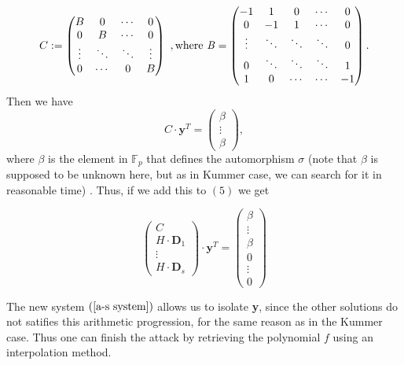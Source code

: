 \documentclass[10pt]{article}
\newcommand{\cd}{\cdot}
\begin{document}
\begin{equation*} 
C := 
\begin{pmatrix}
B & 0 & \cdots & 0 \\
0 & B & \cdots & 0 \\
\vdots & \ddots & \ddots & \vdots \\
0 & \cdots & 0 & B
\end{pmatrix} \ , \rm where \it \ 
B = 
\begin{pmatrix}
-1 & 1 & 0 & \cdots & 0 \\
0 & -1 & 1 & \cdots & 0 \\
\vdots & \ddots & \ddots & \ddots & 0 \\
0 & \ddots & \ddots & \ddots & 1 \\
1 & 0 & \cdots & \cdots & -1
\end{pmatrix}.
\end{equation*}
 Then we have
\begin{equation*}
C \cd \textbf{y}^T
= 
\begin{pmatrix}
\beta \\
\vdots \\
\beta
\end{pmatrix},
\end{equation*}
where $\beta$ is the element in $\mathbb{F}_p$ that defines the automorphism $\sigma$ (note that $\beta$ is supposed to be unknown here, but as in Kummer case, we can search for it in reasonable time) . Thus, if we add this to $(5)$ we get

\begin{equation} \label{a-s system}
\begin{pmatrix}
C\\
H \cd \textbf{D}_1 \\
\vdots \\
H \cd \textbf{D}_s
\end{pmatrix}
\cd \textbf{y}^T = 
\begin{pmatrix}
\beta \\
\vdots \\
\beta \\
0 \\
\vdots \\
0
\end{pmatrix} 
\end{equation}

The new system $(\ref{a-s system})$ allows us to isolate \textbf{y}, since the other solutions do not satifies this arithmetic progression, for the same reason as in the Kummer case. Thus one can finish the attack by retrieving the polynomial $f$ using an interpolation method. 
\end{document}
